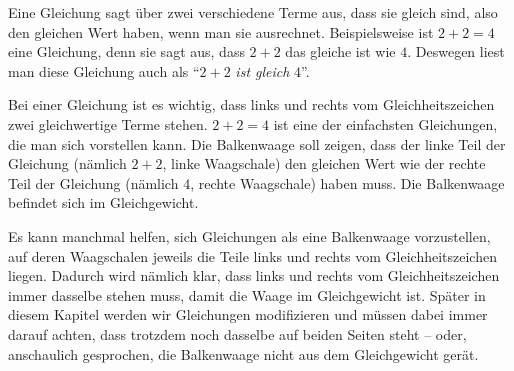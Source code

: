 \documentclass[../../main.tex]{subfiles}
\begin{document}
Eine Gleichung sagt über zwei verschiedene Terme aus, dass sie gleich sind, also den gleichen Wert haben, wenn man sie ausrechnet. Beispielsweise ist $2+2=4$ eine Gleichung, denn sie sagt aus, dass $2+2$ das gleiche ist wie $4$. Deswegen liest man diese Gleichung auch als \enquote{$2+2$ \emph{ist gleich} $4$}.

Bei einer Gleichung ist es wichtig, dass links und rechts vom Gleichheitszeichen zwei gleichwertige Terme stehen. $2+2=4$ ist eine der einfachsten Gleichungen, die man sich vorstellen kann. Die Balkenwaage soll zeigen, dass der linke Teil der Gleichung (nämlich $2+2$, linke Waagschale) den gleichen Wert wie der rechte Teil der Gleichung (nämlich $4$, rechte Waagschale) haben muss. Die Balkenwaage befindet sich im Gleichgewicht.

Es kann manchmal helfen, sich Gleichungen als eine Balkenwaage vorzustellen, auf deren Waagschalen jeweils die Teile links und rechts vom Gleichheitszeichen liegen. Dadurch wird nämlich klar, dass links und rechts vom Gleichheitszeichen immer dasselbe stehen muss, damit die Waage im Gleichgewicht ist. Später in diesem Kapitel werden wir Gleichungen modifizieren und müssen dabei immer darauf achten, dass trotzdem noch dasselbe auf beiden Seiten steht -- oder, anschaulich gesprochen, die Balkenwaage nicht aus dem Gleichgewicht gerät.
\end{document}

